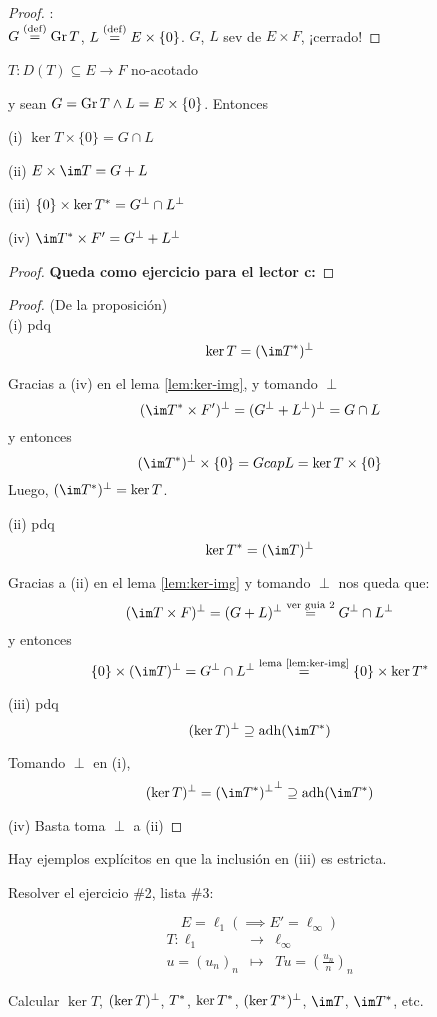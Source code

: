 \begin{proof}:\\
$G \stackrel{\text{(def)}}{=} \operatorname{\mathop{\text{\upshape{Gr}}}} T$, $L \stackrel{\text{(def)}}{=} E \times \{ 0 \}$. $G$, $L$ sev de $E \times F$, ¡cerrado!
\end{proof}

\begin{lem}\label{lem:ker-img}
$T: D(T) \subseteq E \to F$ no-acotado

y sean $G = \operatorname{\mathop{\text{\upshape{Gr}}}} T \wedge L = E \times \{ 0 \}$. Entonces

(i) $
\ker T \times \{ 0 \} = G \cap L
$

(ii) $
E \times \im T = G + L
$

(iii) $
\{ 0 \} \times \ker T^{*} = G^{\perp} \cap L^{\perp}
$

(iv) $
\im T\adj \times F' = G\ort + L\ort
$
\end{lem}

\begin{proof}
\textbf{Queda como ejercicio para el lector c:}
\end{proof}

\begin{proof}(De la proposición) \\

(i) pdq $$\ker T = (\im T\adj)\ort$$

Gracias a (iv) en el lema \ref{lem:ker-img}, y tomando $\perp$ $$
(\im T\adj \times F')\ort = (G\ort + L\ort)\ort = G \cap L
$$ y entonces $$
(\im T\adj)\ort \times \{ 0 \} = G cap L = \ker T \times \{ 0 \}
$$ Luego, $(\im T\adj)\ort = \ker T$.

(ii) pdq $$
\ker T\adj = (\im T )\ort
$$

Gracias a (ii) en el lema \ref{lem:ker-img} y tomando $\perp$ nos queda que: $$
(\im T \times F)\ort = (G + L)\ort \overset{\text{ver guia 2}}{=} G\ort \cap L\ort
$$ y entonces $$
 \{ 0 \} \times (\im T )\ort = G\ort \cap L\ort \overset{\text{lema \ref{lem:ker-img}}}{=} \{ 0 \} \times \ker T \adj
$$

(iii) pdq $$
(\ker T)\ort \supseteq \adh( \im T\adj )
$$

Tomando $\perp$ en (i), $$
(\ker T)\ort = {(\im T\adj)\ort}\ort \supseteq \adh(\im T \adj)
$$

(iv) Basta toma $\perp$ a (ii)
\end{proof}

\begin{note}
Hay ejemplos explícitos en que la inclusión en (iii) es estricta.

Resolver el ejercicio \#2, lista \#3:

$$
E = \ell_1 (\implies E' = \ell_{\infty})
$$
$$
\begin{array}{rcl}
     T : \ell_1 &\to &\ell_{\infty} \\
     u=(u_n)_n &\mapsto &Tu = \left( \frac{u_n}{n} \right)_n
\end{array}
$$

Calcular $\ker T$, $(\ker T )^{\perp} $, $T^{*}$, $\ker T^{*}$, $(\ker T^{*})^{\perp}$, $\im T$, $\im T\adj$, etc.
\end{note}

